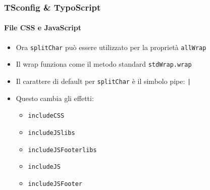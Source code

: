 \begin{frame}[fragile]
	\frametitle{TSconfig \& TypoScript}
	\framesubtitle{File CSS e JavaScript}

	\begin{itemize}
		\item Ora \texttt{splitChar} può essere utilizzato per la proprietà \texttt{allWrap}
		\item Il wrap funziona come il metodo standard \texttt{stdWrap.wrap}
		\item Il carattere di default per \texttt{splitChar} è il simbolo pipe: \texttt{|}
		\item Questo cambia gli effetti:

			\begin{itemize}
				\item \texttt{includeCSS}
				\item \texttt{includeJSlibs}
				\item \texttt{includeJSFooterlibs}
				\item \texttt{includeJS}
				\item \texttt{includeJSFooter}
			\end{itemize}

	\end{itemize}

\end{frame}


